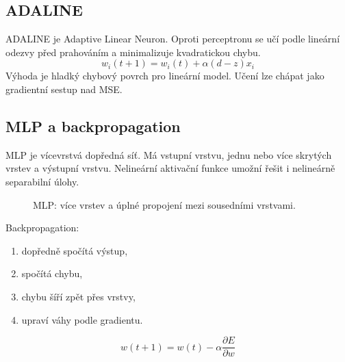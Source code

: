 \subsection*{ADALINE}
ADALINE je Adaptive Linear Neuron. Oproti perceptronu se učí podle lineární
odezvy před prahováním a minimalizuje kvadratickou chybu.
\begin{equation}
    w_i(t+1)=w_i(t)+\alpha(d-z)x_i
\end{equation}
Výhoda je hladký chybový povrch pro lineární model. Učení lze chápat jako
gradientní sestup nad MSE.

\subsection*{MLP a backpropagation}
MLP je vícevrstvá dopředná síť. Má vstupní vrstvu, jednu nebo více skrytých
vrstev a výstupní vrstvu. Nelineární aktivační funkce umožní řešit i nelineárně
separabilní úlohy.

\begin{figure}[H]
    \centering
    \caption{MLP: více vrstev a úplné propojení mezi sousedními vrstvami.}
\end{figure}

Backpropagation:
\begin{enumerate}
    \item dopředně spočítá výstup,
    \item spočítá chybu,
    \item chybu šíří zpět přes vrstvy,
    \item upraví váhy podle gradientu.
\end{enumerate}
\begin{equation}
    w(t+1)=w(t)-\alpha\frac{\partial E}{\partial w}
\end{equation}

